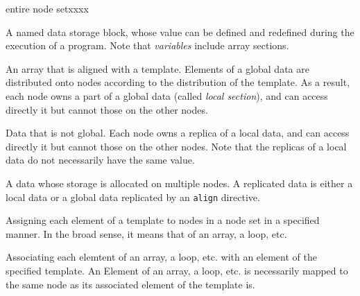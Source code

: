 \begin{namelist}{entire node setxxxx}


 A named data storage block, whose value can be defined and redefined
 during the execution of a program. Note that {\it variables} include
 array sections.


 An array that is aligned with a template. Elements of a global data are
 distributed onto nodes according to the distribution of the
 template. As a result, each node owns a part of a global data (called
 {\it local section}), and can access directly it but cannot those on
 the other nodes.



 Data that is not global. Each node owns a replica of a local data,
 and can access directly it but cannot those on the other nodes. Note
 that the replicas of a local data do not necessarily have the same
 value.



 A data whose storage is allocated on multiple nodes. A replicated data
 is either a local data or a global data replicated by an {\tt align}
 directive.


 Assigning each element of a template to nodes in a node set in a
 specified manner. In the broad sense, it means that of an array, a
 loop, etc.



 Associating each elemtent of an array, a loop, etc. with an element of
 the specified template. An Element of an array, a loop, etc. is
 necessarily mapped to the same node as its associated element of the
 template is.



\end{namelist}
